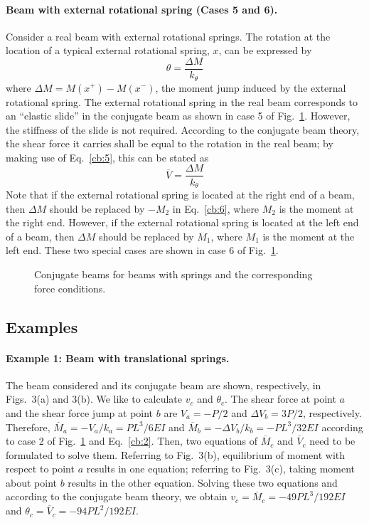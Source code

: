 \paragraph{Beam with external rotational spring (Cases 5 and 6).}
Consider a real beam with external rotational springs. The rotation at the location of a typical external rotational spring, $x$, can be expressed by
\begin{equation}
  \theta = \frac{\Delta M}{k_\theta} \tag{5}\label{cb:5}
\end{equation}
where $\Delta M = M(x^+) - M(x^-)$, the moment jump induced by the external rotational spring. The external rotational spring in the real beam corresponds to an ``elastic slide'' in the conjugate beam as shown in case 5 of Fig.~\ref{fig:cb2}. However, the stiffness of the slide is not required. According to the conjugate beam theory, the shear force it carries shall be equal to the rotation in the real beam; by making use of Eq.~\eqref{cb:5}, this can be stated as
\begin{equation}
  \overline V = \frac{\Delta M}{k_\theta} \tag{6}\label{cb:6}
\end{equation}
Note that if the external rotational spring is located at the right end of a beam, then $\Delta M$ should be replaced by $-M_2$ in Eq.~\eqref{cb:6}, where $M_2$ is the moment at the right end. However, if the external rotational spring is located at the left end of a beam, then $\Delta M$ should be replaced by $M_1$, where $M_1$ is the moment at the left end. These two special cases are shown in case 6 of Fig.~\ref{fig:cb2}.
\begin{figure}[H]
  \centering
  
  \caption{Conjugate beams for beams with springs and the corresponding force conditions.}
  \label{fig:cb2}
\end{figure}

\subsection*{Examples}
\paragraph{Example 1: Beam with translational springs.}
The beam considered and its conjugate beam are shown, respectively, in Figs.~3(a) and 3(b). We like to calculate $v_c$ and $\theta_c$. The shear force at point $a$ and the shear force jump at point $b$ are $V_a = -P/2$ and $\Delta V_b = 3P/2$, respectively. Therefore, $\overline M_a = -V_a/k_a = PL^3/6EI$ and $\overline M_b = -\Delta V_b/k_b = -PL^3/32EI$ according to case 2 of Fig.~\ref{fig:cb2} and Eq.~\eqref{cb:2}. Then, two equations of $\overline M_c$ and $\overline V_c$ need to be formulated to solve them. Referring to Fig.~3(b), equilibrium of moment with respect to point $a$ results in one equation; referring to Fig.~3(c), taking moment about point $b$ results in the other equation. Solving these two equations and according to the conjugate beam theory, we obtain $v_c = \overline M_c = -49PL^3/192EI$ and $\theta_c = \overline V_c = -94PL^2/192EI$.
\begin{figure}[H]
  \centering
  
\end{figure}

